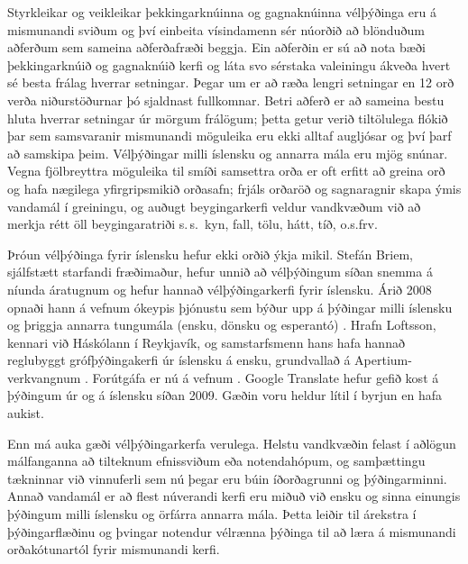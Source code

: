 \begin{multicols}{2}
Styrkleikar og veikleikar þekkingarknúinna og gagnaknúinna vélþýðinga eru á mismunandi sviðum og því einbeita vísindamenn sér núorðið að blönduðum aðferðum sem sameina aðferðafræði beggja. Ein aðferðin er sú að nota bæði þekkingarknúið og gagnaknúið kerfi og láta svo sérstaka valeiningu ákveða hvert sé besta frálag hverrar setningar. Þegar um er að ræða lengri setningar en 12 orð verða niðurstöðurnar þó sjaldnast fullkomnar. Betri aðferð er að sameina bestu hluta hverrar setningar úr mörgum frálögum; þetta getur verið tiltölulega flókið þar sem samsvaranir mismunandi möguleika eru ekki alltaf augljósar og því þarf að samskipa þeim.
Vélþýðingar milli íslensku og annarra mála eru mjög snúnar. Vegna fjölbreyttra möguleika til smíði samsettra orða er oft erfitt að greina orð og hafa nægilega yfirgripsmikið orðasafn; frjáls orðaröð og sagnaragnir skapa ýmis vandamál í greiningu, og auðugt beygingarkerfi veldur vandkvæðum við að merkja rétt öll beygingaratriði s.\,s.~kyn, fall, tölu, hátt, tíð, o.s.frv.

Þróun vélþýðinga fyrir íslensku hefur ekki orðið ýkja mikil. Stefán Briem, sjálfstætt starfandi fræðimaður, hefur unnið að vélþýðingum síðan snemma á níunda áratugnum og hefur hannað vélþýðingarkerfi fyrir íslensku. Árið 2008 opnaði hann á vefnum ókeypis þjónustu sem býður upp á þýðingar milli íslensku og þriggja annarra tungumála (ensku, dönsku og esperantó) \cite{tut1}. Hrafn Loftsson, kennari við Háskólann í Reykjavík, og samstarfsmenn hans hafa hannað reglubyggt grófþýðingakerfi úr íslensku á ensku, grundvallað á Apertium-verkvangnum \cite{ape1}. Forútgáfa er nú á vefnum \cite{ape2}. Google Translate hefur gefið kost á þýðingum úr og á íslensku síðan 2009. Gæðin voru heldur lítil í byrjun en hafa aukist.

Enn má auka gæði vélþýðingarkerfa verulega. Helstu vandkvæðin felast í aðlögun málfanganna að tilteknum efnissviðum eða notendahópum, og samþættingu tækninnar við vinnuferli sem nú þegar eru búin íðorðagrunni og þýðingarminni. Annað vandamál er að flest núverandi kerfi eru miðuð við ensku og sinna einungis þýðingum milli íslensku og örfárra annarra mála. Þetta leiðir til árekstra í þýðingarflæðinu og þvingar notendur vélrænna þýðinga til að læra á mismunandi orðakótunartól fyrir mismunandi kerfi.


\end{multicols}
